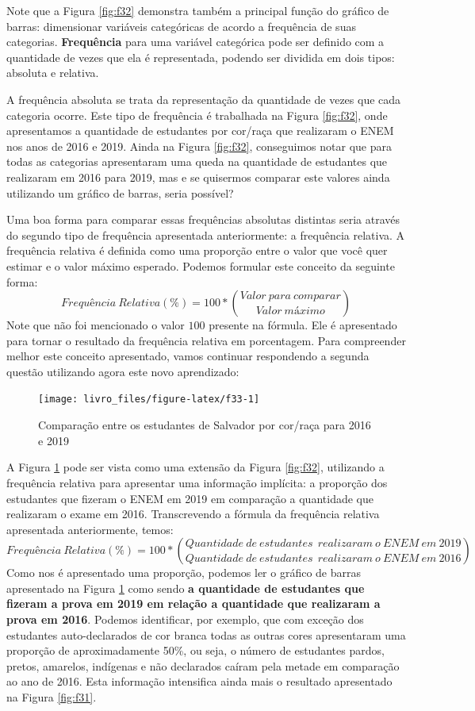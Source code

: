 \documentclass[
]{book}
\begin{document}
Note que a Figura \ref{fig:f32} demonstra também a principal função do gráfico de barras: dimensionar variáveis categóricas de acordo a frequência de suas categorias. \textbf{Frequência} para uma variável categórica pode ser definido com a quantidade de vezes que ela é representada, podendo ser dividida em dois tipos: absoluta e relativa.

A frequência absoluta se trata da representação da quantidade de vezes que cada categoria ocorre. Este tipo de frequência é trabalhada na Figura \ref{fig:f32}, onde apresentamos a quantidade de estudantes por cor/raça que realizaram o ENEM nos anos de 2016 e 2019. Ainda na Figura \ref{fig:f32}, conseguimos notar que para todas as categorias apresentaram uma queda na quantidade de estudantes que realizaram em 2016 para 2019, mas e se quisermos comparar este valores ainda utilizando um gráfico de barras, seria possível?

Uma boa forma para comparar essas frequências absolutas distintas seria através do segundo tipo de frequência apresentada anteriormente: a frequência relativa. A frequência relativa é definida como uma proporção entre o valor que você quer estimar e o valor máximo esperado. Podemos formular este conceito da seguinte forma:
\[Frequência\ Relativa (\%) = 100*{Valor\ para\ comparar \choose Valor\ máximo}\]
Note que não foi mencionado o valor \(100\) presente na fórmula. Ele é apresentado para tornar o resultado da frequência relativa em porcentagem. Para compreender melhor este conceito apresentado, vamos continuar respondendo a segunda questão utilizando agora este novo aprendizado:

\begin{figure}

{\centering \texttt{[image: livro\_files/figure-latex/f33-1]} 

}

\caption{Comparação entre os estudantes de Salvador por cor/raça para 2016 e 2019}\label{fig:f33}
\end{figure}

A Figura \ref{fig:f33} pode ser vista como uma extensão da Figura \ref{fig:f32}, utilizando a frequência relativa para apresentar uma informação implícita: a proporção dos estudantes que fizeram o ENEM em 2019 em comparação a quantidade que realizaram o exame em 2016. Transcrevendo a fórmula da frequência relativa apresentada anteriormente, temos:
\[Frequência\ Relativa (\%) = 100*{Quantidade\ de\ estudantes\ \ realizaram\ o\ ENEM\ em\ 2019\choose Quantidade\ de\ estudantes\ \ realizaram\ o\ ENEM\ em\ 2016}\]
Como nos é apresentado uma proporção, podemos ler o gráfico de barras apresentado na Figura \ref{fig:f33} como sendo \textbf{a quantidade de estudantes que fizeram a prova em 2019 em relação a quantidade que realizaram a prova em 2016}. Podemos identificar, por exemplo, que com exceção dos estudantes auto-declarados de cor branca todas as outras cores apresentaram uma proporção de aproximadamente 50\%, ou seja, o número de estudantes pardos, pretos, amarelos, indígenas e não declarados caíram pela metade em comparação ao ano de 2016. Esta informação intensifica ainda mais o resultado apresentado na Figura \ref{fig:f31}.
\end{document}
